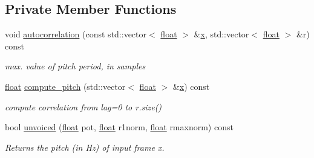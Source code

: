 \subsection*{Private Member Functions}
\begin{DoxyCompactItemize}
\item 
void \hyperlink{classupc_1_1PitchAnalyzer_a45da4fa8b3d7bd67d87468a3153a839e}{autocorrelation} (const std\+::vector$<$ \hyperlink{FFTReal__readme_8txt_a0ea2fae2a8106200bf378b90eae003cf}{float} $>$ \&\hyperlink{FFTReal__readme_8txt_a9c92ac89d1560f812393ca39a19e581e}{x}, std\+::vector$<$ \hyperlink{FFTReal__readme_8txt_a0ea2fae2a8106200bf378b90eae003cf}{float} $>$ \&r) const 
\begin{DoxyCompactList}\small\item\em max. value of pitch period, in samples \end{DoxyCompactList}\item 
\hyperlink{FFTReal__readme_8txt_a0ea2fae2a8106200bf378b90eae003cf}{float} \hyperlink{classupc_1_1PitchAnalyzer_abb8bc34c74953c8d43127fe4acb6b4eb}{compute\+\_\+pitch} (std\+::vector$<$ \hyperlink{FFTReal__readme_8txt_a0ea2fae2a8106200bf378b90eae003cf}{float} $>$ \&\hyperlink{FFTReal__readme_8txt_a9c92ac89d1560f812393ca39a19e581e}{x}) const 
\begin{DoxyCompactList}\small\item\em compute correlation from lag=0 to r.\+size() \end{DoxyCompactList}\item 
bool \hyperlink{classupc_1_1PitchAnalyzer_a0b32960107336078d87118cb10d6c83f}{unvoiced} (\hyperlink{FFTReal__readme_8txt_a0ea2fae2a8106200bf378b90eae003cf}{float} pot, \hyperlink{FFTReal__readme_8txt_a0ea2fae2a8106200bf378b90eae003cf}{float} r1norm, \hyperlink{FFTReal__readme_8txt_a0ea2fae2a8106200bf378b90eae003cf}{float} rmaxnorm) const 
\begin{DoxyCompactList}\small\item\em Returns the pitch (in Hz) of input frame x. \end{DoxyCompactList}\end{DoxyCompactItemize}
